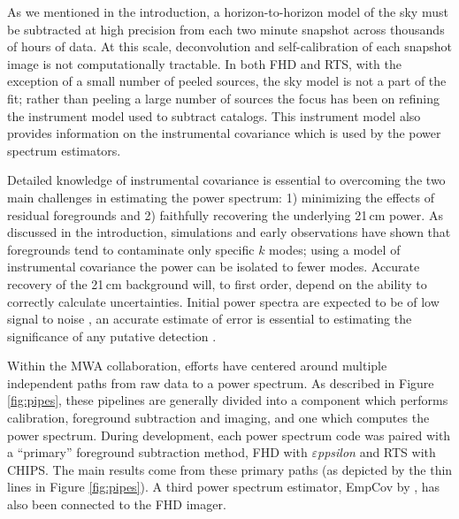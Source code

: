 \documentclass[twolcolumn,iop]{emulateapj}
\def\eppsilon{{\it $\varepsilon$ppsilon}}
\def\empirical{EmpCov}
\def\dilloncite{\cite{PhysRevD.91.123011} }
\begin{document}
As we mentioned in the introduction, a horizon-to-horizon model of the sky must be subtracted at high precision from each two minute snapshot across thousands of hours of data. At this scale, deconvolution and self-calibration of each snapshot image is not computationally tractable.  In both FHD and RTS, with the exception of a small number of peeled sources, the sky model is not a part of the fit; rather than peeling a large number of sources the focus has been on refining the instrument model used to subtract catalogs.  This instrument model also provides information on the instrumental covariance which is used by the power spectrum estimators.


Detailed knowledge of instrumental covariance is essential to overcoming the two main challenges in estimating the power spectrum: 1) minimizing the effects of residual foregrounds and 2) faithfully recovering the underlying 21\,cm power.   As discussed in the introduction, simulations and early observations have shown that foregrounds tend to contaminate only specific $k$ modes; using a model of instrumental covariance the power can be isolated to fewer modes.  Accurate recovery of the 21\,cm background will, to first order, depend on the ability to correctly calculate uncertainties.  Initial power spectra are expected to be of low signal to noise \citep{Pober:2014p10390,Beardsley:2013p9952}, an accurate estimate of error is essential to estimating the significance of any putative detection . 


  Within the MWA collaboration, efforts have centered around multiple independent paths from raw data to a power spectrum.  As described in Figure \ref{fig:pipes}, these pipelines are generally divided into a component which performs calibration, foreground subtraction and imaging, and one which computes the power spectrum.  During development, each power spectrum code was paired with a ``primary'' foreground subtraction method, FHD with \eppsilon{} and RTS with CHIPS.   The main results come from these primary paths (as depicted by the thin lines in Figure \ref{fig:pipes}).  A third power spectrum estimator, \empirical{} by \dilloncite{}, has also been connected to the FHD imager. 
\end{document}
